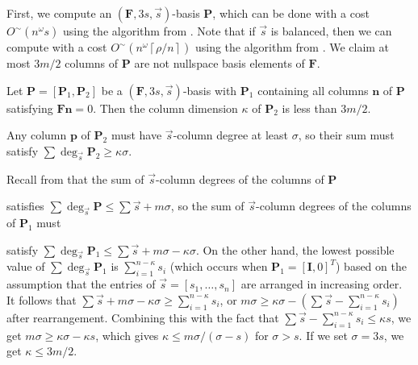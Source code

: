 First, we compute an $\left(\mathbf{F},3s,\vec{s}\right)$-basis $\mathbf{P}$,
which can be done with a cost $O^{\sim}\left(n^{\omega}s\right)$
using the algorithm from \citet{Giorgi2003}. Note that if $\vec{s}$
is balanced, then we can compute with a cost $O^{\sim}\left(n^{\omega}\left\lceil \rho/n\right\rceil \right)$
using the algorithm from \textbf{\citet{za2009}}. We claim at most
$3m/2$ columns of \textbf{$\mathbf{P}$} are not nullspace basis
elements of $\mathbf{F}$.
\begin{lem}
\label{lem:dimensionOfPartialNullspaceBasisBasedOnOrder} Let $\mathbf{P}=[\mathbf{P}_{1},\mathbf{P}_{2}]$
be a $(\mathbf{F},3s,\vec{s})$-basis with $\mathbf{P}_{1}$ containing
all columns $\mathbf{n}$ of $\mathbf{P}$ satisfying $\mathbf{F}\mathbf{n}=0$.
Then the column dimension $\kappa$ of $\mathbf{P}_{2}$ is less than
$3m/2.$\end{lem}
\begin{pf}
Any column $\mathbf{p}$ of $\mathbf{P}_{2}$ must have $\vec{s}$-column
degree at least $\sigma$, so their sum must satisfy $\sum\deg_{\vec{s}}\mathbf{P}_{2}\ge\kappa\sigma$.
\begin{comment}
$\sum_{i=n-k+1}^{n}s_{i}$ must be at least $k\sigma$
\end{comment}
{} Recall from 
that the sum of $\vec{s}$-column degrees of the columns of $\mathbf{P}$
\begin{comment}
is at most 
\end{comment}
{} satisfies $\sum\deg_{\vec{s}}\mathbf{P}\le\sum\vec{s}+m\sigma$,
so the sum of $\vec{s}$-column degrees of the columns of $\mathbf{P}_{1}$
must %
\begin{comment}
be at most
\end{comment}
{} satisfy $\sum\deg_{\vec{s}}\mathbf{P}_{1}\le\sum\vec{s}+m\sigma-\kappa\sigma$.
On the other hand, the lowest possible value of $\sum\deg_{\vec{s}}\mathbf{P}_{1}$
is $\sum_{i=1}^{n-\kappa}s_{i}$ (which occurs when $\mathbf{P}_{1}=\left[\mathbf{I},0\right]^{T}$)
based on the assumption that the entries of $\vec{s}=\left[s_{1},\dots,s_{n}\right]$
are arranged in increasing order. It follows that $\sum\vec{s}+m\sigma-\kappa\sigma\ge\sum_{i=1}^{n-\kappa}s_{i}$,
or $m\sigma\ge\kappa\sigma-\left(\sum\vec{s}-\sum_{i=1}^{n-\kappa}s_{i}\right)$
after rearrangement. Combining this with the fact that $\sum\vec{s}-\sum_{i=1}^{n-\kappa}s_{i}\le\kappa s$,
we get $m\sigma\ge\kappa\sigma-\kappa s$, which gives $\kappa\le m\sigma/(\sigma-s)$
for $\sigma>s$. If we set $\sigma=3s$, we get $\kappa\le3m/2$.
\end{pf}

